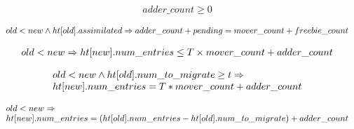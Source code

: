 \begin{lemma}
    \begin{equation*}
\begin{array}{l}      
  adder\_count \geq 0
\end{array}
    \end{equation*}  
    \label{posted0}  
\end{lemma}

\begin{lemma}
  \begin{equation*}
    \begin{array}{l}      
      old < new \wedge \mbox{$ht[old]$}.assimilated \Rightarrow adder\_count+ pending = mover\_count + freebie\_count
    \end{array}
  \end{equation*}    
  \label{posted1}
\end{lemma}

\begin{lemma}
  \begin{equation*}
    \begin{array}{l}      
      old < new \Rightarrow \mbox{$ht[new]$}.num\_entries \leq T \times mover\_count + adder\_count
    \end{array}
  \end{equation*}  
  \label{upper_strengthening1}
\end{lemma}

\begin{lemma}
\begin{equation*}
\begin{array}{l}  
  old < new \wedge \mbox{$ht[old]$}.num\_to\_migrate \geq t \Rightarrow
  \\ \mbox{$ht[new]$}.num\_entries = T * mover\_count + adder\_count
\end{array}
\end{equation*}
\label{upper_strengthening2}  
\end{lemma}

\begin{lemma}
  \begin{equation*}
    \begin{array}{l}  
      old < new \Rightarrow \\
  \mbox{$ht[new]$}.num\_entries = (\mbox{$ht[old]$}.num\_entries - \mbox{$ht[old]$}.num\_to\_migrate) + adder\_count
\end{array}
\end{equation*}
  \label{upper_strengthening3}  
\end{lemma}

